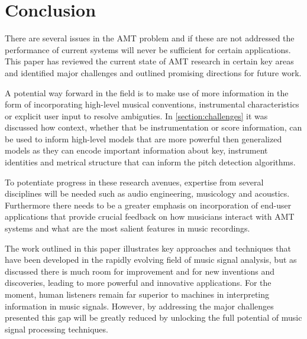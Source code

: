 \section{Conclusion}
There are several issues in the AMT problem and if these are not addressed the
performance of current systems will never be sufficient for certain
applications. This paper has reviewed the current state of AMT research in
certain key areas and identified major challenges and outlined promising
directions for future work.

A potential way forward in the field is to make use of more information in the
form of incorporating high-level musical conventions, instrumental
characteristics or explicit user input to resolve ambiguties. In
\autoref{section:challenges} it was discussed how context, whether that be
instrumentation or score information, can be used to inform high-level models
that are more powerful then generalized models as they can encode important
information about key, instrument identities and metrical structure that can
inform the pitch detection algorithms.

To potentiate progress in these research avenues, expertise from several
disciplines will be needed such as audio engineering, musicology and acoustics.
Furthermore there needs to be a greater emphasis on incorporation of end-user
applications that provide crucial feedback on how musicians interact with AMT
systems and what are the most salient features in music recordings.

The work outlined in this paper illustrates key approaches and techniques that
have been developed in the rapidly evolving field of music signal analysis, but
as discussed there is much room for improvement and for new inventions and
discoveries, leading to more powerful and innovative applications. For the
moment, human listeners remain far superior to machines in interpreting
information in music signals. However, by addressing the major challenges
presented this gap will be greatly reduced by unlocking the full potential of
music signal processing techniques.


